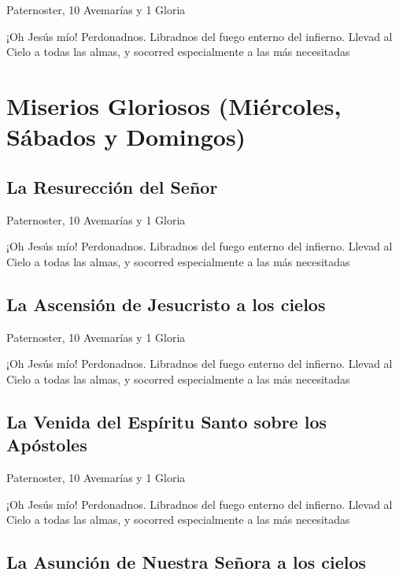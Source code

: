 \documentclass[a4paper,11pt, oneside]{report}
\begin{document}
        \smallskip
         Paternoster, 10 Avemarías y 1 Gloria
        
        \smallskip
        ¡Oh Jesús mío! Perdonadnos. Libradnos del fuego enterno del infierno. Llevad al Cielo a todas las almas, y socorred especialmente a las más 
        necesitadas
        
    \section{Miserios Gloriosos (Miércoles, Sábados y Domingos)}
      \subsection{La Resurección del Señor}
        
        \smallskip
         Paternoster, 10 Avemarías y 1 Gloria
        
        \smallskip
        ¡Oh Jesús mío! Perdonadnos. Libradnos del fuego enterno del infierno. Llevad al Cielo a todas las almas, y socorred especialmente a las más 
        necesitadas
      
      \subsection{La Ascensión de Jesucristo a los cielos}
        
        \smallskip
         Paternoster, 10 Avemarías y 1 Gloria
        
        \smallskip
        ¡Oh Jesús mío! Perdonadnos. Libradnos del fuego enterno del infierno. Llevad al Cielo a todas las almas, y socorred especialmente a las más 
        necesitadas
        
      \subsection{La Venida del Espíritu Santo sobre los Apóstoles}
        
        \smallskip
         Paternoster, 10 Avemarías y 1 Gloria
        
        \smallskip
        ¡Oh Jesús mío! Perdonadnos. Libradnos del fuego enterno del infierno. Llevad al Cielo a todas las almas, y socorred especialmente a las más 
        necesitadas

      \subsection{La Asunción de Nuestra Señora a los cielos}
        
\end{document}
